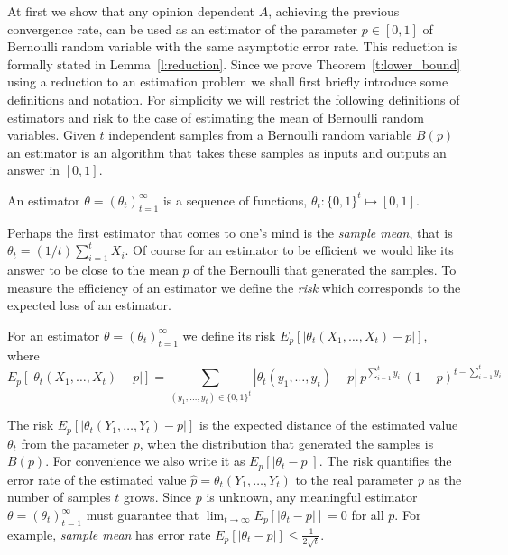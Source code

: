 At first we show that any opinion dependent $A$, achieving the previous
convergence rate, can be used as an estimator of the parameter
$p \in [0,1] $ of Bernoulli random variable with the same asymptotic error
rate. This reduction is formally stated in Lemma~\ref{l:reduction}.
Since we prove Theorem~\ref{t:lower_bound} using a reduction to
an estimation problem we shall first briefly introduce some definitions and
notation. For simplicity we will restrict the following definitions
of estimators and risk to the case of estimating the mean of Bernoulli
random variables.
Given $t$ independent samples from a Bernoulli random variable $B(p)$
an estimator is an algorithm that takes these samples as inputs and
outputs an answer in $[0,1]$.
\begin{definition}\label{d:estimator}
  An estimator $\theta=(\theta_t)_{t=1}^{\infty}$
  is a sequence of functions, $\theta_t: \{0,1\}^t\mapsto [0,1]$.
\end{definition}
Perhaps the first estimator that comes to one's mind is the
\emph{sample mean}, that is $\theta_t=(1/t) \sum_{i=1}^t X_i$.
Of course for an estimator to be efficient we would like its answer to be
close to the mean $p$ of the Bernoulli that generated the samples.
To measure the efficiency of an estimator we define the \emph{risk}
which corresponds to the expected loss of an estimator.
\begin{definition}\label{d:risk}
  For an estimator $\theta =(\theta_t)_{t=1}^\infty$ we define
  its risk
  $E_p[|\theta_t(X_1,\ldots,X_t) - p|]$,
  where
  \[
    E_p[|\theta_t(X_1,\ldots,X_t) - p|]
    = \sum_{(y_1,\ldots,y_t)\in\{0,1\}^t}
    |\theta_t(y_1,\ldots,y_t) -p|\
    p^{\sum_{i=1}^t y_i}\ (1-p)^{t-\sum_{i=1}^t y_i}
  \]
\end{definition}
The risk $E_p[|\theta_t(Y_1,\ldots,Y_t) - p|]$ is the expected distance
of the estimated value $\theta_t$ from the parameter $p$, when the
distribution that generated the samples is $B(p)$.
For convenience we also write it as $E_p[|\theta_t - p|]$.
The risk quantifies the error rate of
the estimated value $\hat{p} =\theta_t(Y_1,\ldots,Y_t)$ to the
real parameter $p$ as the number of samples $t$ grows.
Since $p$ is unknown, any meaningful estimator $\theta=(\theta_t)_{t=1}^\infty$
must guarantee that $\lim_{t \to \infty} E_p[|\theta_t - p|]=0$ for all $p$.
For example, \emph{sample mean} has error rate
$E_p[|\theta_t-p|] \leq \frac{1}{2\sqrt{t}}$.

